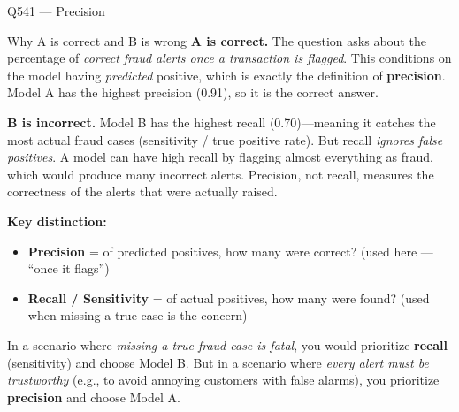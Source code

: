 \documentclass[aspectratio=169,8pt]{beamer}
\begin{document}
\begin{frame}{Q541 --- Precision}
		\begin{block}{Why A is correct and B is wrong}
			\textbf{A is correct.} The question asks about the percentage of
			\emph{correct fraud alerts once a transaction is flagged}. This conditions
			on the model having \emph{predicted} positive, which is exactly the
			definition of \textbf{precision}. Model A has the highest precision
			(0.91), so it is the correct answer.
			
			\textbf{B is incorrect.} Model B has the highest recall (0.70)---meaning
			it catches the most actual fraud cases (sensitivity / true positive rate).
			But recall \emph{ignores false positives}. A model can have high recall
			by flagging almost everything as fraud, which would produce many
			incorrect alerts. Precision, not recall, measures the correctness of
			the alerts that were actually raised.
			
			\textbf{Key distinction:}
			\begin{itemize}
				\item \textbf{Precision} = of predicted positives, how many were
				correct? (used here --- ``once it flags'')
				\item \textbf{Recall / Sensitivity} = of actual positives, how many
				were found? (used when missing a true case is the concern)
			\end{itemize}
			
			In a scenario where \emph{missing a true fraud case is fatal}, you would
			prioritize \textbf{recall} (sensitivity) and choose Model B. But in a
			scenario where \emph{every alert must be trustworthy} (e.g., to avoid
			annoying customers with false alarms), you prioritize \textbf{precision}
			and choose Model A.
		\end{block}
	\end{frame}
	
\end{document}
